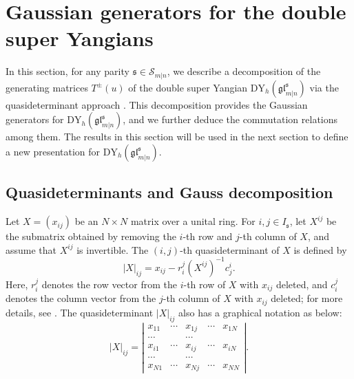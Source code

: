 \documentclass[a4paper,12pt]{article}
\numberwithin{equation}{section}
\begin{document}
\section{Gaussian generators for the double super Yangians}

In this section, for any parity $\mathfrak{s}\in \mathcal{S}_{m|n}$, we describe a decomposition of the generating matrices $T^{\pm}(u)$ of the double super Yangian $\mathrm{DY}_{h}(\mathfrak{gl}_{m|n}^{\mathfrak{s}})$ via the quasideterminant approach \cite{GGRW05}. This decomposition provides the Gaussian generators for $\mathrm{DY}_{h}(\mathfrak{gl}_{m|n}^{\mathfrak{s}})$, and we further deduce the commutation relations among them. The results in this section will be used in the next section to define a new presentation for $\mathrm{DY}_{h}(\mathfrak{gl}_{m|n}^{\mathfrak{s}})$.
 
\subsection{Quasideterminants and Gauss decomposition}

Let $X=(x_{ij})$ be an $N\times N$ matrix  over a unital ring. For $i,j\in I_{\mathfrak{s}}$, let $X^{ij}$ be the submatrix obtained by removing the $i$-th row and $j$-th column of $X$, and assume that $X^{ij}$ is invertible.
The $(i,j)$-th quasideterminant of $X$ is defined by
$$
|X|_{i j}=x_{ij}-r_{i}^{j}(X^{ij})^{-1}c_{j}^{i}.
$$
Here, $r_{i}^{j}$ denotes the row vector from the $i$-th row of $X$ with $x_{ij}$ deleted, and $c_{i}^{j}$ denotes the column vector from the $j$-th column of $X$ with $x_{ij}$ deleted; for more details, see \cite{GGRW05}. 
The quasideterminant $|X|_{i j}$ also has a graphical notation as below:
$$
|X|_{i j}=\left|\begin{array}{ccccc}
x_{11} & \cdots & x_{1 j} & \cdots & x_{1 N} \\
\cdots & & \cdots & \\
x_{i 1} & \cdots & \boxed{x_{i j}} & \cdots & x_{i N} \\
\cdots & & \cdots & \\
x_{N 1} & \cdots & x_{N j} & \cdots & x_{N N}
\end{array}\right|.
$$
\end{document}
